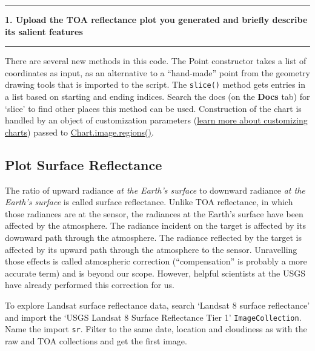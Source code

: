\documentclass[
]{article}
\begin{document}
\begin{center}\rule{0.5\linewidth}{0.5pt}\end{center}

\textbf{1. Upload the TOA reflectance plot you generated and briefly describe its salient features }

\begin{center}\rule{0.5\linewidth}{0.5pt}\end{center}

There are several new methods in this code. The Point constructor takes a list of coordinates as input, as an alternative to a ``hand-made'' point from the geometry drawing tools that is imported to the script. The \texttt{slice()} method gets entries in a list based on starting and ending indices. Search the docs (on the \textbf{Docs} tab) for `slice' to find other places this method can be used. Construction of the chart is handled by an object of customization parameters (\href{https://developers.google.com/earth-engine/charts_image_histogram}{learn more about customizing charts}) passed to \href{https://developers.google.com/earth-engine/charts_image_regions}{Chart.image.regions()}.

\hypertarget{plot-surface-reflectance}{%
\subsection{Plot Surface Reflectance}\label{plot-surface-reflectance}}

The ratio of upward radiance \emph{at the Earth's surface} to downward radiance \emph{at the Earth's surface} is called surface reflectance. Unlike TOA reflectance, in which those radiances are at the sensor, the radiances at the Earth's surface have been affected by the atmosphere. The radiance incident on the target is affected by its downward path through the atmosphere. The radiance reflected by the target is affected by its upward path through the atmosphere to the sensor. Unravelling those effects is called atmospheric correction (``compensation'' is probably a more accurate term) and is beyond our scope. However, helpful scientists at the USGS have already performed this correction for us.

To explore Landsat surface reflectance data, search `Landsat 8 surface reflectance' and import the `USGS Landsat 8 Surface Reflectance Tier 1' \texttt{ImageCollection}. Name the import \texttt{sr}. Filter to the same date, location and cloudiness as with the raw and TOA collections and get the first image.
\end{document}
